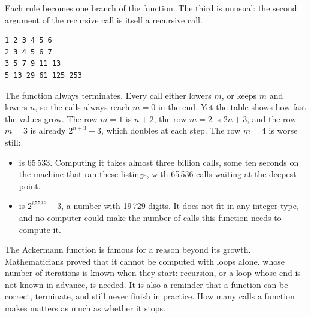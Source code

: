 Each rule becomes one branch of the function. The third is unusual: the second
argument of the recursive call is itself a recursive call.


\vspace{-10pt}%
\begin{lstlisting}[style=bashVerb]
1 2 3 4 5 6
2 3 4 5 6 7
3 5 7 9 11 13
5 13 29 61 125 253
\end{lstlisting}

The function always terminates. Every call either lowers $m$, or keeps $m$ and
lowers $n$, so the calls always reach $m = 0$ in the end. Yet the table shows
how fast the values grow. The row $m = 1$ is $n + 2$, the row $m = 2$ is
$2n + 3$, and the row $m = 3$ is already $2^{n+3} - 3$, which doubles at each
step. The row $m = 4$ is worse still:

\begin{itemize}
\item {} is 65\,533. Computing it takes almost three billion
  calls, some ten seconds on the machine that ran these listings, with 65\,536
  calls waiting at the deepest point.
\item {} is $2^{65536} - 3$, a number with 19\,729 digits.
  It does not fit in any integer type, and no computer could make the number of
  calls this function needs to compute it.
\end{itemize}

The Ackermann function is famous for a reason beyond its growth. Mathematicians
proved that it cannot be computed with  loops alone, whose number of
iterations is known when they start: recursion, or a loop whose end is not known
in advance, is needed. It is also a reminder that a function can be correct,
terminate, and still never finish in practice. How many calls a function makes
matters as much as whether it stops.
